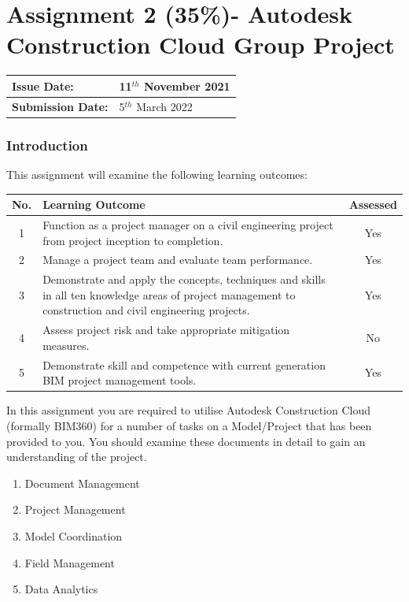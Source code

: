 
	

\part*{Assignment 2 (35\%)- Autodesk Construction Cloud Group Project}


\begin{tabularx}{\textwidth}{ |X|X| }
	\hline
	\textbf{Issue Date:} & 11$^{th}$ November 2021\\
	\hline 
	\textbf{Submission Date:}  & 5$^{th}$ March 2022\\
	\hline
\end{tabularx}

\section*{Introduction}

This assignment will examine the following learning outcomes:\\

\begin{tabularx}{\textwidth}{ |c|X|c| }
	\hline
	\textbf{No.} & \textbf{Learning Outcome} & \textbf{Assessed} \\
	\hline 
	1  & Function as a project manager on a civil engineering project from project inception to completion. & Yes \\
	2  & Manage a project team and evaluate team performance. & Yes \\
	3  & Demonstrate and apply the concepts, techniques and skills in all ten knowledge areas of project management to construction and civil engineering projects. & Yes \\
	4  & Assess project risk and take appropriate mitigation measures. & No \\
	5  & Demonstrate skill and competence with current generation BIM project management tools. & Yes \\
	\hline
\end{tabularx}


In this assignment you are required to utilise Autodesk Construction Cloud (formally BIM360) for a number of tasks on a Model/Project that has been provided to you.  You should examine these documents in detail to gain an understanding of the project.\\

\begin{enumerate}
	\item Document Management 
	\item Project Management
	\item Model Coordination
	\item Field Management
	\item Data Analytics
\end{enumerate}

